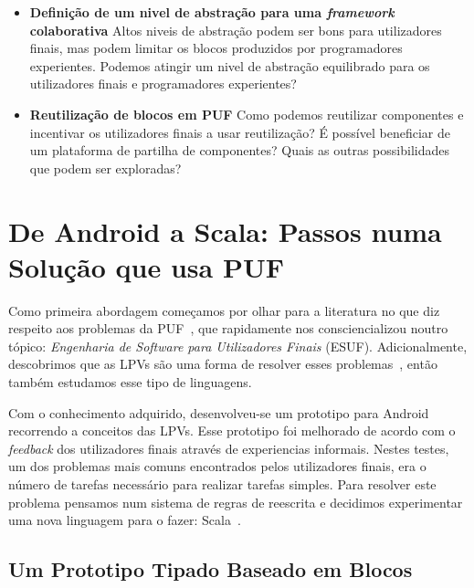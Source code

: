 \documentclass[9pt,a4paper]{extarticle}
\begin{document}
\begin{multicols}{2}
\begin{itemize}
	\item{\textbf{Definição de um nivel de abstração para uma \emph{framework} colaborativa} 
	Altos niveis de abstração podem ser bons para utilizadores finais, mas podem limitar os blocos produzidos por programadores experientes. Podemos atingir um nivel de abstração equilibrado para os utilizadores finais e programadores experientes?}
  
	\item{\textbf{Reutilização de blocos em PUF} 
	Como podemos reutilizar componentes e incentivar os utilizadores finais a usar reutilização? É possível beneficiar de um plataforma de partilha de componentes? Quais as outras possibilidades que podem ser exploradas?}
	
\end{itemize}

\section{De Android a Scala: Passos numa Solução que usa PUF} \label{sec:work}

Como primeira abordagem começamos por olhar para a literatura no que diz respeito aos problemas da PUF~\cite{Barriers2004}, que rapidamente nos consciencializou noutro tópico: \emph{Engenharia de Software para Utilizadores Finais} (ESUF). Adicionalmente, descobrimos que as LPVs são uma forma de resolver esses problemas~\cite{Navarro2001}, então também estudamos esse tipo de linguagens.

Com o conhecimento adquirido, desenvolveu-se um prototipo para Android recorrendo a conceitos das LPVs. Esse prototipo foi melhorado de acordo com o \emph{feedback} dos utilizadores finais através de experiencias informais.
Nestes testes, um dos problemas mais comuns encontrados pelos utilizadores finais, era o número de tarefas necessário para realizar tarefas simples. Para resolver este problema pensamos num sistema de regras de reescrita e decidimos experimentar uma nova linguagem para o fazer: Scala~\cite{ProgrammingScala}.


\subsection{Um Prototipo Tipado Baseado em Blocos}


\end{multicols}
\end{document}
